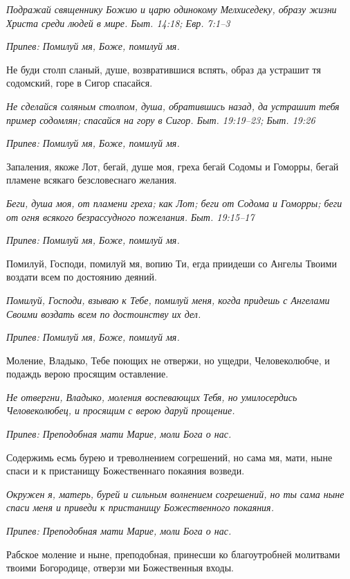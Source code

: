 \itshape Подражай священнику Божию и царю одинокому Мелхиседеку, образу жизни Христа среди людей в мире. Быт. 14:18; Евр. 7:1–3\normalfont{}


\itshape Припев:\normalfont{} Помилуй мя, Боже, помилуй мя.


Не буди столп сланый, душе, возвратившися вспять, образ да устрашит тя содомский, горе в Сигор спасайся.


\itshape Не сделайся соляным столпом, душа, обратившись назад, да устрашит тебя пример содомлян; спасайся на гору в Сигор. Быт. 19:19–23; Быт. 19:26\normalfont{}


\itshape Припев:\normalfont{} Помилуй мя, Боже, помилуй мя.


Запаления, якоже Лот, бегай, душе моя, греха бегай Содомы и Гоморры, бегай пламене всякаго безсловеснаго желания.


\itshape Беги, душа моя, от пламени греха; как Лот; беги от Содома и Гоморры; беги от огня всякого безрассудного пожелания. Быт. 19:15–17\normalfont{}


\itshape Припев:\normalfont{} Помилуй мя, Боже, помилуй мя.


Помилуй, Господи, помилуй мя, вопию Ти, егда приидеши со Ангелы Твоими воздати всем по достоянию деяний.


\itshape Помилуй, Господи, взываю к Тебе, помилуй меня, когда придешь с Ангелами Своими воздать всем по достоинству их дел.\normalfont{}


\itshape Припев:\normalfont{} Помилуй мя, Боже, помилуй мя.


Моление, Владыко, Тебе поющих не отвержи, но ущедри, Человеколюбче, и подаждь верою просящим оставление.


\itshape Не отвергни, Владыко, моления воспевающих Тебя, но умилосердись Человеколюбец, и просящим с верою даруй прощение.\normalfont{}


\itshape Припев:\normalfont{} Преподобная мати Марие, моли Бога о нас.


Содержимь есмь бурею и треволнением согрешений, но сама мя, мати, ныне спаси и к пристанищу Божественнаго покаяния возведи.


\itshape Окружен я, матерь, бурей и сильным волнением согрешений, но ты сама ныне спаси меня и приведи к пристанищу Божественного покаяния.\normalfont{}


\itshape Припев:\normalfont{} Преподобная мати Марие, моли Бога о нас.


Рабское моление и ныне, преподобная, принесши ко благоутробней молитвами твоими Богородице, отверзи ми Божественныя входы.


